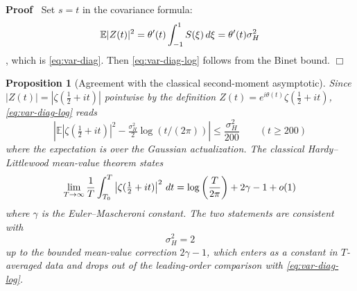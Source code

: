 \documentclass{article}
\newenvironment{proof}{\noindent\textbf{Proof\ }}{\hspace*{\fill}$\Box$\medskip}
\newtheorem{proposition}{Proposition}
\begin{document}
\begin{proof}
  Set $s = t$ in the covariance formula:
  \begin{equation}
    \mathbb{E} |Z (t) |^2 = \theta' (t)  \int_{- 1}^1 S (\xi)  \hspace{0.17em}
    d \xi = \theta' (t) \sigma_H^2
  \end{equation}
  , which is \eqref{eq:var-diag}. Then \eqref{eq:var-diag-log} follows from
  the Binet bound.
\end{proof}

\begin{proposition}
  [Agreement with the classical second-moment asymptotic]\label{prop:HL}Since
  $|Z (t) | = | \zeta (\tfrac{1}{2} + it) |$ pointwise by the definition $Z
  (t) = e^{i \theta (t)} \zeta (\tfrac{1}{2} + it)$, \eqref{eq:var-diag-log}
  reads
  \begin{equation}
    \left| \mathbb{E} \left| \zeta (\tfrac{1}{2} + it) \right|^2 -
    \tfrac{\sigma_H^2}{2} \log (t / (2 \pi)) \right| \le
    \frac{\sigma_H^2}{200}  \qquad (t \ge 200) \label{eq:HL-pointwise}
  \end{equation}
  where the expectation is over the Gaussian actualization. The classical
  Hardy--Littlewood mean-value theorem states
  \begin{equation}
    \lim_{T \to \infty \label{eq:HL-classical}} \frac{1}{T}  \int_{T_0}^T
    \left| \zeta (\tfrac{1}{2} + it) \right|^2  \hspace{0.17em} dt = \log
    \left( \frac{T}{2 \pi} \right) + 2 \gamma - 1 + o (1)
  \end{equation}
  where $\gamma$ is the Euler--Mascheroni constant. The two statements are
  consistent with
  \begin{equation}
    \sigma_H^2 = 2 \label{eq:sigmaH-fix}
  \end{equation}
  up to the bounded mean-value correction $2 \gamma - 1$, which enters as a
  constant in $T$-averaged data and drops out of the leading-order comparison
  with \eqref{eq:var-diag-log}.
\end{proposition}
\end{document}
